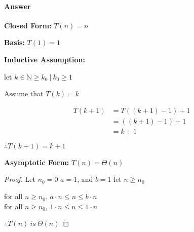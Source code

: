 \documentclass{article}
\begin{document}
\paragraph{Answer}

{\bf Closed Form:} $T (n) = n$

{\bf Basis:} $T (1) = 1$

{\bf Inductive Assumption:}

let $k \in \mathbb{N} \geq k_{0}\ |\ k_{0} \geq 1$

Assume that $T (k) = k$

\begin{align*}
    T (k + 1) &= T((k+1)-1) +1\\
    &= ((k+1) -1 ) +1\\
    &= k + 1
\end{align*}

$\therefore T(k+1)=k+1$

{\bf Asymptotic Form:} $T(n)=\Theta(n)$

\begin{proof}

    Let $n_{0} = 0$
$a=1$, and $b= 1$
let $n \geq n_{0}$

for all $n \geq n_{0}$, $a \cdot n \leq n \leq b \cdot n$\\
for all $n \geq n_{0}$, $1 \cdot n \leq n \leq 1 \cdot n$

$\therefore T(n)\ is\ \Theta(n)$

\end{proof}




\end{document}
